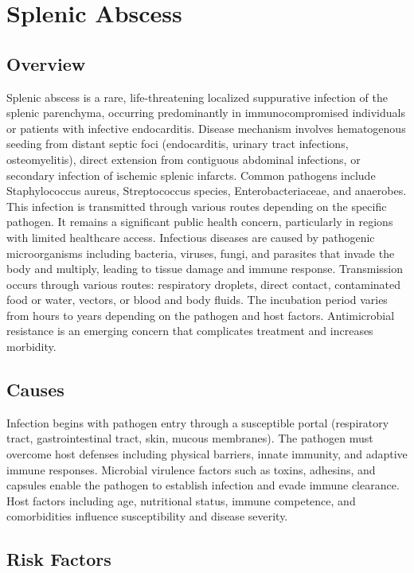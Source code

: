 \chapter{Splenic Abscess}
\label{sec:Splenic Abscess}

\section{Overview}
Splenic abscess is a rare, life-threatening localized suppurative infection of the splenic parenchyma, occurring predominantly in immunocompromised individuals or patients with infective endocarditis. Disease mechanism involves hematogenous seeding from distant septic foci (endocarditis, urinary tract infections, osteomyelitis), direct extension from contiguous abdominal infections, or secondary infection of ischemic splenic infarcts. Common pathogens include Staphylococcus aureus, Streptococcus species, Enterobacteriaceae, and anaerobes. This infection is transmitted through various routes depending on the specific pathogen. It remains a significant public health concern, particularly in regions with limited healthcare access. Infectious diseases are caused by pathogenic microorganisms including bacteria, viruses, fungi, and parasites that invade the body and multiply, leading to tissue damage and immune response. Transmission occurs through various routes: respiratory droplets, direct contact, contaminated food or water, vectors, or blood and body fluids. The incubation period varies from hours to years depending on the pathogen and host factors. Antimicrobial resistance is an emerging concern that complicates treatment and increases morbidity.
\section{Causes}
Infection begins with pathogen entry through a susceptible portal (respiratory tract, gastrointestinal tract, skin, mucous membranes). The pathogen must overcome host defenses including physical barriers, innate immunity, and adaptive immune responses. Microbial virulence factors such as toxins, adhesins, and capsules enable the pathogen to establish infection and evade immune clearance. Host factors including age, nutritional status, immune competence, and comorbidities influence susceptibility and disease severity.
\section{Risk Factors}

